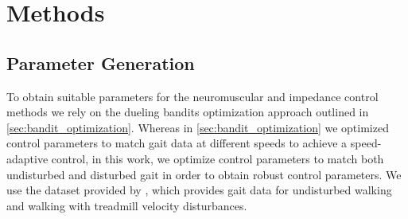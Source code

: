 \section{Methods}

\subsection{Parameter Generation}
To obtain suitable parameters for the neuromuscular and impedance control
methods we rely on the dueling bandits optimization approach outlined in
\cref{sec:bandit_optimization}. Whereas in \cref{sec:bandit_optimization} we
optimized control parameters to match gait data at different speeds to achieve a
speed-adaptive control, in this work, we optimize control parameters to match
both undisturbed and disturbed gait in order to obtain robust control
parameters. We use the dataset provided by \citet{moore2015elaborate}, which
provides gait data for undisturbed walking and walking with treadmill velocity
disturbances. 

